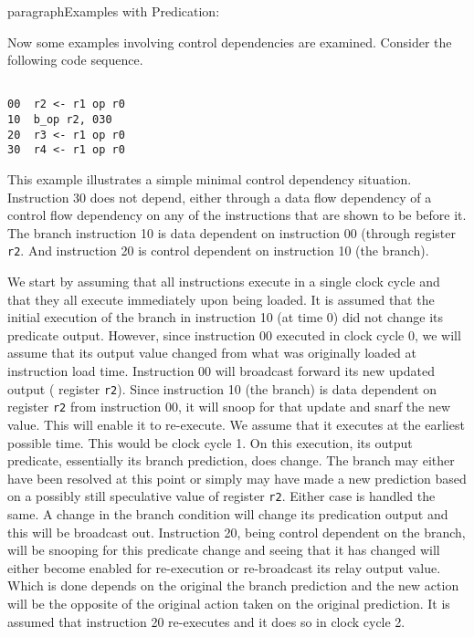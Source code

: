 paragraph{Examples with Predication: }

Now some examples involving control dependencies are
examined.  Consider the following code sequence.

\begin{verbatim}

00	r2 <- r1 op r0
10	b_op r2, 030
20	r3 <- r1 op r0
30	r4 <- r1 op r0

\end{verbatim}

This example illustrates a simple minimal control dependency
situation.
Instruction 30 does not depend, either through a data flow dependency
of a control flow dependency on any of the instructions that
are shown to be before it.  The branch instruction 10 is data
dependent on instruction 00 (through register
{\tt r2}.
And instruction 20 is control
dependent on instruction 10 (the branch).

We start by assuming that all instructions execute in a single clock
cycle and that they all execute immediately upon being loaded.
It is assumed that the initial execution of the branch in
instruction 10 (at time 0) did not change its predicate output.
However, since instruction 00 executed in clock cycle 0, we will
assume that its output value changed from what was originally loaded
at instruction load time.  Instruction 00 will broadcast forward
its new updated output (
register
{\tt r2}).
Since instruction 10 (the branch) is data dependent on
register
{\tt r2}
from instruction 00, it will snoop for that update
and snarf the new value.  This will enable it to re-execute.
We assume that it executes at the earliest possible time.
This would be clock cycle 1.  On this execution, its output predicate,
essentially its branch prediction, does change.  The branch may either
have been resolved at this point or simply may have made a new prediction
based on a possibly still speculative value of register
{\tt r2}.
Either case is handled the same.
A change in the branch condition will change its
predication output and this will be
broadcast out.
Instruction 20, being control dependent on the branch, will be snooping
for this predicate change and seeing that it has changed
will either become enabled for re-execution or re-broadcast
its relay output value.  Which is done depends on the original
the branch prediction and the new action will be the opposite
of the original action taken on the original prediction.
It is assumed that instruction 20 re-executes and it does so
in clock cycle 2.

